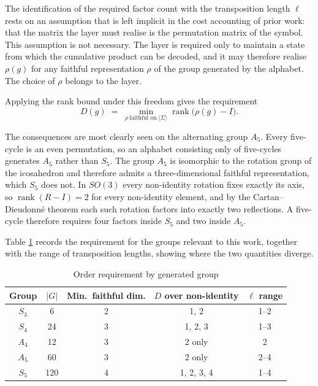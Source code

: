 The identification of the required factor count with the transposition length
$\ell$ rests on an assumption that is left implicit in the cost accounting of
prior work: that the matrix the layer must realise is the permutation matrix of
the symbol. This assumption is not necessary. The layer is required only to
maintain a state from which the cumulative product can be decoded, and it may
therefore realise $\rho(g)$ for any faithful representation $\rho$
\cite{serre} of the group generated by the alphabet. The choice of $\rho$
belongs to the layer.

Applying the rank bound under this freedom gives the requirement
\begin{equation}
D(g) \;=\; \min_{\rho \ \text{faithful on} \ \langle \Sigma \rangle}
\operatorname{rank}\bigl(\rho(g) - I\bigr).
\label{eq:demand}
\end{equation}

The consequences are most clearly seen on the alternating group $A_5$. Every
five-cycle is an even permutation, so an alphabet consisting only of five-cycles
generates $A_5$ rather than $S_5$. The group $A_5$ is isomorphic to the rotation
group of the icosahedron and therefore admits a three-dimensional faithful
representation, which $S_5$ does not. In $SO(3)$ every non-identity rotation
fixes exactly its axis, so $\operatorname{rank}(R - I) = 2$ for every
non-identity element, and by the Cartan--Dieudonn\'e theorem \cite{geometricalgebra} each such rotation
factors into exactly two reflections. A five-cycle therefore requires four
factors inside $S_5$ and two inside $A_5$.

Table \ref{table:demand} records the requirement for the groups relevant to this
work, together with the range of transposition lengths, showing where the two
quantities diverge.

\begin{table}[ht]
	\caption{Order requirement by generated group}
	\centering
	\begin{tabular}{c c c c c}
		\hline\hline
		Group & $|G|$ & Min.\ faithful dim. & $D$ over non-identity & $\ell$ range \\ [0.5ex]
		\hline
		$S_3$ & 6 & 2 & 1, 2 & 1--2 \\
		$S_4$ & 24 & 3 & 1, 2, 3 & 1--3 \\
		$A_4$ & 12 & 3 & 2 only & 2 \\
		$A_5$ & 60 & 3 & 2 only & 2--4 \\
		$S_5$ & 120 & 4 & 1, 2, 3, 4 & 1--4 \\ [1ex]
		\hline
	\end{tabular}
	\label{table:demand}
\end{table}

